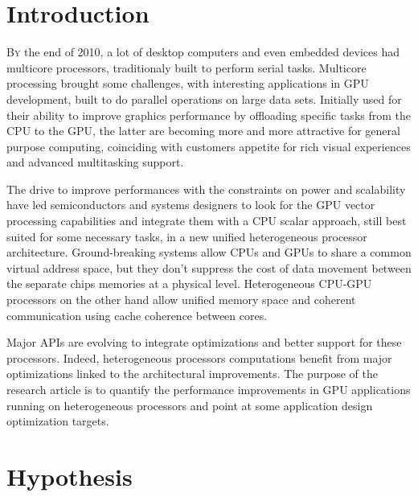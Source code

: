 \documentclass[11pt,twoside,a4paper]{article}
\begin{document}
\begin{multicols}{2} %

\section{Introduction}

\lettrine[nindent=0em,lines=3]{B}y the end of 2010, a lot of desktop computers
and even embedded devices had multicore processors, traditionaly built to
perform serial tasks. Multicore processing brought some challenges, with
interesting applications in GPU development, built to do parallel
operations on large data sets. Initially used for their ability to improve
graphics performance by offloading specific tasks from the CPU to the GPU, the
latter are becoming more and more attractive for general purpose computing,
coinciding with customers appetite for rich visual experiences and advanced
multitasking support.

The drive to improve performances with the constraints on power and scalability
have led semiconductors and systems designers to look for the GPU vector
processing capabilities and integrate them with a CPU scalar approach, still
best suited for some necessary tasks, in a new unified heterogeneous processor
architecture. Ground-breaking systems allow CPUs and GPUs to share a common virtual
address space, but they don't suppress the cost of data movement between the
separate chips memories at a physical level. Heterogeneous CPU-GPU processors
on the other hand allow unified memory space and coherent communication using
cache coherence between cores.

Major APIs are evolving to integrate optimizations and better support for these
processors. Indeed, heterogeneous processors computations benefit from major
optimizations linked to the architectural improvements. The purpose of the
research article is to quantify the performance improvements in GPU
applications running on heterogeneous processors and point at some application
design optimization targets.

\section{Hypothesis}


\end{multicols}
\end{document}
